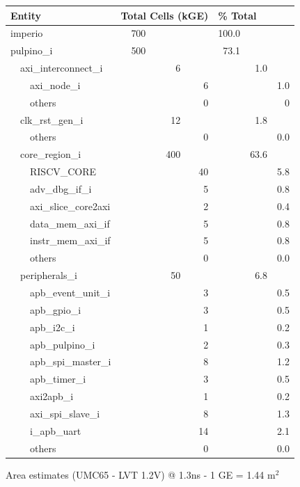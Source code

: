 \begin{figure}[ht!]
\centering
\begin{tabularx}{\textwidth}{Xrrrrrr}
\textbf{Entity} &  \multicolumn{3}{l}{\textbf{Total Cells (kGE)}}  &  \multicolumn{3}{l}{\textbf{\% Total}}  \\\hline
imperio&700&&&100.0&&\\
pulpino\_i&500&&&73.1&&\\
$\quad$axi\_interconnect\_i&&6&&&1.0&\\
$\quad\quad$axi\_node\_i&&&6&&&1.0\\
$\quad\quad$others &&&0&&&0\\
$\quad$clk\_rst\_gen\_i&&12&&&1.8&\\
$\quad\quad$others &&&0&&&0.0\\
$\quad$core\_region\_i&&400&&&63.6&\\
$\quad\quad$RISCV\_CORE&&&40&&&5.8\\
$\quad\quad$adv\_dbg\_if\_i&&&5&&&0.8\\
$\quad\quad$axi\_slice\_core2axi&&&2&&&0.4\\
$\quad\quad$data\_mem\_axi\_if&&&5&&&0.8\\
$\quad\quad$instr\_mem\_axi\_if&&&5&&&0.8\\
$\quad\quad$others &&&0&&&0.0\\
$\quad$peripherals\_i&&50&&&6.8&\\
$\quad\quad$apb\_event\_unit\_i&&&3&&&0.5\\
$\quad\quad$apb\_gpio\_i&&&3&&&0.5\\
$\quad\quad$apb\_i2c\_i&&&1&&&0.2\\
$\quad\quad$apb\_pulpino\_i&&&2&&&0.3\\
$\quad\quad$apb\_spi\_master\_i&&&8&&&1.2\\
$\quad\quad$apb\_timer\_i&&&3&&&0.5\\
$\quad\quad$axi2apb\_i&&&1&&&0.2\\
$\quad\quad$axi\_spi\_slave\_i&&&8&&&1.3\\
$\quad\quad$i\_apb\_uart&&&14&&&2.1\\
$\quad\quad$others &&&0&&&0.0\\
\end{tabularx}
\caption{Area estimates (UMC65 - LVT 1.2V) @ 1.3ns - 1 GE = 1.44 \textmu m$^2$}
\label{fig:area}
\end{figure}



